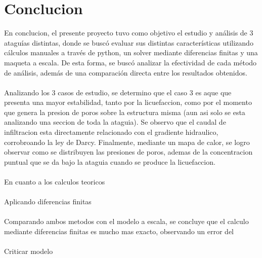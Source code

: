 \section{Conclucion}


En conclucion, el presente proyecto tuvo como objetivo el estudio y análisis de 3 ataguías distintas, donde se buscó evaluar sus distintas características utilizando cálculos manuales a través de python, un solver mediante diferencias finitas y una maqueta a escala. 
De esta forma, se buscó analizar la efectividad de cada método de análisis, además de una comparación directa entre los resultados obtenidos. 
\\ \\
Analizando los 3 casos de estudio, se determino que el caso 3 es aque que presenta una mayor estabilidad, tanto por la licuefaccion, como por el momento que genera la presion de poros sobre la estructura misma (aun asi solo se esta analizando una seccion de toda la ataguia).
Se observo que el caudal de infiltracion esta directamente relacionado con el gradiente hidraulico, corrobroando la ley de Darcy. Finalmente, mediante un mapa de calor, se logro observar como se distribuyen las presiones de poros, ademas de la concentracion puntual que se da bajo
la ataguia cuando se produce la licuefaccion.
\\ \\
En cuanto a los calculos teoricos
\\ \\
Aplicando diferencias finitas
\\ \\
Comparando ambos metodos con el modelo a escala, se concluye que el calculo mediante diferencias finitas es mucho mas exacto, observando un error del 
\\ \\
Criticar modelo